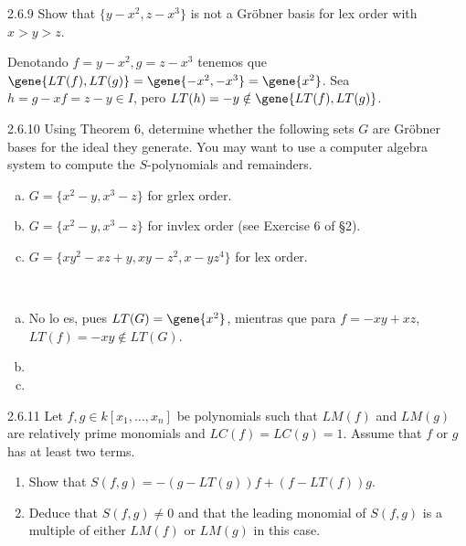 \documentclass[twoside]{article}
\begin{document}
\newpage

\begin{ejercicio}{2.6.9}
Show that $\{y − x^2, z − x^3\}$ is not a Gröbner basis for lex order with $x > y > z$.
\end{ejercicio}
\begin{solucion}
Denotando $f=y − x^2,g=z − x^3$ tenemos que $\gene{LT(f),LT(g)}=\gene{-x^2,-x^3}=\gene{x^2}$. Sea $h=g-xf=z-y\in I$, pero $LT(h)=-y\notin\gene{LT(f),LT(g)}$.
\end{solucion}

\newpage

\begin{ejercicio}{2.6.10}
Using Theorem 6, determine whether the following sets $G$ are Gröbner bases for the
ideal they generate. You may want to use a computer algebra system to compute the
$S$-polynomials and remainders.
\begin{enumerate}[a.]
\item $G = \{x^2 − y, x^3 − z\}$ for grlex order.
\item $G = \{x^2 − y, x^3 − z\}$ for invlex order (see Exercise 6 of §2).
\item $G = \{xy^2 − xz + y, xy − z^2, x − yz^4\}$ for lex order.
\end{enumerate}
\end{ejercicio}
\begin{solucion}\
\begin{enumerate}[a.]
\item No lo es, pues $LT(G)=\gene{x^2}$, mientras que para $f=-xy+xz$, $LT(f)=-xy\notin LT(G)$. 
\item 
\item 
\end{enumerate}
\end{solucion}

\newpage

\begin{ejercicio}{2.6.11}
Let $f , g ∈ k[x_1,\dots , x_n]$ be polynomials such that $LM( f )$ and $LM(g)$ are relatively prime
monomials and $LC( f) = LC(g) = 1$. Assume that $f$ or $g$ has at least two terms.
\begin{enumerate}
\item Show that $S( f , g) = −(g − LT(g))f + (f − LT( f ))g$.
\item Deduce that $S( f , g) \neq 0$ and that the leading monomial of $S( f , g)$ is a multiple of
either $LM( f )$ or $LM(g)$ in this case.
\end{enumerate}
\end{ejercicio}
\begin{solucion}

\end{solucion}
\end{document}
